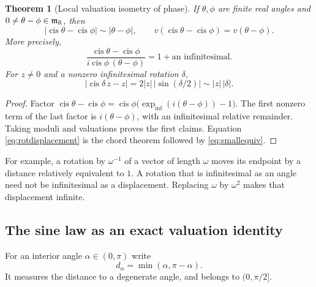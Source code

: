 \documentclass[11pt,letterpaper]{article}
\newtheorem{theorem}{Theorem}[section]
\theoremstyle{definition}
\theoremstyle{remark}
\newcommand{\R}{\mathbb R}\newcommand{\C}{\mathbb C}
\newcommand{\cis}{\operatorname{cis}}
\newcommand{\expi}{\operatorname{exp}_{\mathrm{inf}}}
\numberwithin{equation}{section}
\begin{document}
\begin{theorem}[Local valuation isometry of phase]\label{thm:phaseisometry}
If $\theta,\phi$ are finite real angles and $0\ne\theta-\phi\in\mm_{\R}$, then
\begin{equation}\label{eq:phaseisometry}
 |\cis\theta-\cis\phi|\sim|\theta-\phi|,
 \qquad v(\cis\theta-\cis\phi)=v(\theta-\phi).
\end{equation}
More precisely,
\[
 \frac{\cis\theta-\cis\phi}{i\cis\phi\,(\theta-\phi)}=1+\text{an infinitesimal}.
\]
For $z\ne0$ and a nonzero infinitesimal rotation $\delta$,
\begin{equation}\label{eq:rotdisplacement}
 |\cis\delta\,z-z|
 =2|z|\,|\sin(\delta/2)|\sim |z|\,|\delta|.
\end{equation}
\end{theorem}
\begin{proof}
Factor $\cis\theta-\cis\phi=\cis\phi\bigl(\expi(i(\theta-\phi))-1\bigr)$. The first nonzero term of the last factor is $i(\theta-\phi)$, with an infinitesimal relative remainder. Taking moduli and valuations proves the first claims. Equation \eqref{eq:rotdisplacement} is the chord theorem followed by \eqref{eq:smallequiv}.
\end{proof}
For example, a rotation by $\omega^{-1}$ of a vector of length $\omega$ moves its endpoint by a distance relatively equivalent to $1$. A rotation that is infinitesimal as an angle need not be infinitesimal as a displacement. Replacing $\omega$ by $\omega^2$ makes that displacement infinite.

\subsection{The sine law as an exact valuation identity}
For an interior angle $\alpha\in(0,\pi)$ write
\[
 d_\alpha=\min(\alpha,\pi-\alpha).
\]
It measures the distance to a degenerate angle, and belongs to $(0,\pi/2]$.
\end{document}
